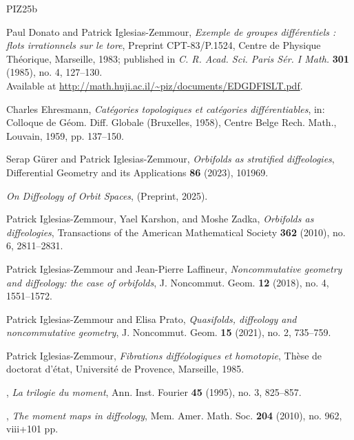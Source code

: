 \documentclass[10pt,reqno,letterpaper,twoside]{amsart}
\theoremstyle{article}
\begin{document}
  \begin{thebibliography}{PIZ25b}
    
    Paul Donato and Patrick Iglesias-Zemmour,
    \emph{Exemple de groupes différentiels : flots irrationnels sur le tore},
    Preprint CPT-83/P.1524, Centre de Physique Théorique, Marseille, 1983; published in \emph{C. R. Acad. Sci. Paris Sér. I Math.} \textbf{301} (1985), no. 4, 127--130.\\
    Available at {\scriptsize\url{http://math.huji.ac.il/~piz/documents/EDGDFISLT.pdf}}.
    
    Charles Ehresmann,
    \emph{Catégories topologiques et catégories différentiables},
    in: Colloque de Géom. Diff. Globale (Bruxelles, 1958), Centre Belge Rech. Math., Louvain, 1959, pp. 137--150.
    
    Serap G{\"u}rer and Patrick Iglesias-Zemmour,
    \emph{Orbifolds as stratified diffeologies},
    {Differential Geometry and its Applications} \textbf{86} (2023), 101969.
    
    \bysame
    \emph{On Diffeology of Orbit Spaces},
    (Preprint, 2025).
    
    Patrick Iglesias-Zemmour, Yael Karshon, and Moshe Zadka,
    \emph{Orbifolds as diffeologies},
    Transactions of the American Mathematical Society \textbf{362} (2010), no. 6, 2811--2831.
    
    Patrick Iglesias-Zemmour and Jean-Pierre Laffineur,
    \emph{Noncommutative geometry and diffeology: the case of orbifolds},
    J. Noncommut. Geom. \textbf{12} (2018), no. 4, 1551--1572.
    
    Patrick Iglesias-Zemmour and Elisa Prato,
    \emph{Quasifolds, diffeology and noncommutative geometry},
    J. Noncommut. Geom. \textbf{15} (2021), no. 2, 735--759.
    
    Patrick Iglesias-Zemmour,
    \emph{Fibrations difféologiques et homotopie},
    Thèse de doctorat d'état, Université de Provence, Marseille, 1985.
    
    \bysame,
    \emph{La trilogie du moment},
    Ann. Inst. Fourier \textbf{45} (1995), no. 3, 825--857.
    
    \bysame,
    \emph{The moment maps in diffeology},
    Mem. Amer. Math. Soc. \textbf{204} (2010), no. 962, viii+101 pp.
    

\end{thebibliography}
\end{document}
